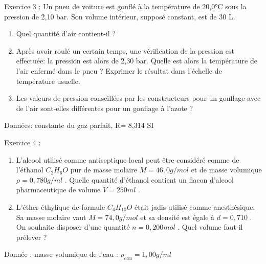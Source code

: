 \documentclass[12pt, french]{article}
\begin{document}
\begin{Box2}{Exercice 3 :}
Un pneu de voiture est gonflé à la température de 20,0°C sous la pression de 2,10 bar. Son volume intérieur, supposé constant, est de 30 L.
   \begin{enumerate}
         \item  Quel quantité d'air contient-il ?
         \item Après avoir roulé un certain temps, une vérification de la pression est effectuée: la pression est alors de 2,30 bar. Quelle est alors la température de l'air enfermé dans le pneu ? Exprimer le résultat dans l'échelle de  température usuelle.
         \item  Les valeurs de pression conseillées par les constructeurs pour un gonflage avec de l'air sont-elles différentes pour un gonflage à l'azote ?

   \end{enumerate}
Données: constante du gaz parfait, R= 8,314 SI

\end{Box2}

\begin{Box2}{Exercice 4 :}
   \begin{enumerate}
      \item  L’alcool utilisé comme antiseptique local peut être considéré comme de l’éthanol $C_2H_6O$ pur de masse molaire $M = 46, 0g/mol$ et de masse volumique $\rho = 0, 780g/ml$ . Quelle quantité d’éthanol contient un flacon d’alcool pharmaceutique de volume $V = 250ml$ .
      \item L’éther éthylique de formule $C_4H_{10}O$ était jadis utilisé comme anesthésique. Sa masse molaire vaut $M = 74, 0g/mol$ et sa densité est égale à $d = 0, 710$ . On souhaite disposer d’une quantité $n = 0, 200mol$ . Quel volume faut-il prélever ?
   \end{enumerate}
   Donnée : masse volumique de l’eau : $\rho_{eau} = 1, 00g/ml$
\end{Box2}



\end{document}

